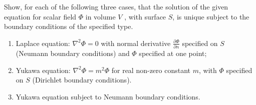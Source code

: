 \documentclass[a4paper]{article}
\begin{document}
\begin{qns}[Uniqueness]
Show, for each of the following three cases, that the solution of the given equation for scalar field $\Phi$ in volume $V$ , with surface $S$, is unique subject to the boundary conditions of the specified type.
\begin{enumerate}[label=(\roman*)]
    \item Laplace equation: $\nabla^2\Phi=0$ with normal derivative $\frac{\partial\Phi}{\partial n}$ specified on $S$ (Neumann boundary conditions) and $\Phi$ specified at one point;
    \item Yukawa equation: $\nabla^2\Phi=m^2\Phi$ for real non-zero constant $m$, with $\Phi$ specified on $S$ (Dirichlet boundary conditions).
    \item Yukawa equation subject to Neumann boundary conditions.
\end{enumerate}
\end{qns}
\end{document}
